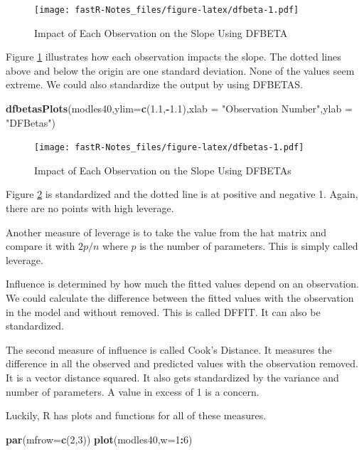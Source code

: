 \documentclass[]{book}
\newenvironment{Shaded}{\begin{snugshade}}{\end{snugshade}}
\newcommand{\KeywordTok}[1]{\textcolor[rgb]{0.13,0.29,0.53}{\textbf{#1}}}
\newcommand{\DataTypeTok}[1]{\textcolor[rgb]{0.13,0.29,0.53}{#1}}
\newcommand{\DecValTok}[1]{\textcolor[rgb]{0.00,0.00,0.81}{#1}}
\newcommand{\FloatTok}[1]{\textcolor[rgb]{0.00,0.00,0.81}{#1}}
\newcommand{\StringTok}[1]{\textcolor[rgb]{0.31,0.60,0.02}{#1}}
\newcommand{\OperatorTok}[1]{\textcolor[rgb]{0.81,0.36,0.00}{\textbf{#1}}}
\newcommand{\NormalTok}[1]{#1}
\theoremstyle{definition}
\theoremstyle{definition}
\theoremstyle{definition}
\theoremstyle{remark}
\begin{document}
\begin{figure}
\centering
\texttt{[image: fastR-Notes\_files/figure-latex/dfbeta-1.pdf]}
\caption{\label{fig:dfbeta}Impact of Each Observation on the Slope Using
DFBETA}
\end{figure}

Figure \ref{fig:dfbeta} illustrates how each observation impacts the
slope. The dotted lines above and below the origin are one standard
deviation. None of the values seem extreme. We could also standardize
the output by using DFBETAS.

\begin{Shaded}
\begin{Highlighting}[]
\KeywordTok{dfbetasPlots}\NormalTok{(modles40,}\DataTypeTok{ylim=}\KeywordTok{c}\NormalTok{(}\FloatTok{1.1}\NormalTok{,}\OperatorTok{-}\FloatTok{1.1}\NormalTok{),}\DataTypeTok{xlab =} \StringTok{"Observation Number"}\NormalTok{,}\DataTypeTok{ylab =} \StringTok{"DFBetas"}\NormalTok{)}
\end{Highlighting}
\end{Shaded}

\begin{figure}
\centering
\texttt{[image: fastR-Notes\_files/figure-latex/dfbetas-1.pdf]}
\caption{\label{fig:dfbetas}Impact of Each Observation on the Slope Using
DFBETAs}
\end{figure}

Figure \ref{fig:dfbetas} is standardized and the dotted line is at
positive and negative 1. Again, there are no points with high leverage.

Another measure of leverage is to take the value from the hat matrix and
compare it with \(2p/n\) where \(p\) is the number of parameters. This
is simply called leverage.

Influence is determined by how much the fitted values depend on an
observation. We could calculate the difference between the fitted values
with the observation in the model and without removed. This is called
DFFIT. It can also be standardized.

The second measure of influence is called Cook's Distance. It measures
the difference in all the observed and predicted values with the
observation removed. It is a vector distance squared. It also gets
standardized by the variance and number of parameters. A value in excess
of 1 is a concern.

Luckily, R has plots and functions for all of these measures.

\begin{Shaded}
\begin{Highlighting}[]
\KeywordTok{par}\NormalTok{(}\DataTypeTok{mfrow=}\KeywordTok{c}\NormalTok{(}\DecValTok{2}\NormalTok{,}\DecValTok{3}\NormalTok{))}
\KeywordTok{plot}\NormalTok{(modles40,}\DataTypeTok{w=}\DecValTok{1}\OperatorTok{:}\DecValTok{6}\NormalTok{)}
\end{Highlighting}
\end{Shaded}
\end{document}

